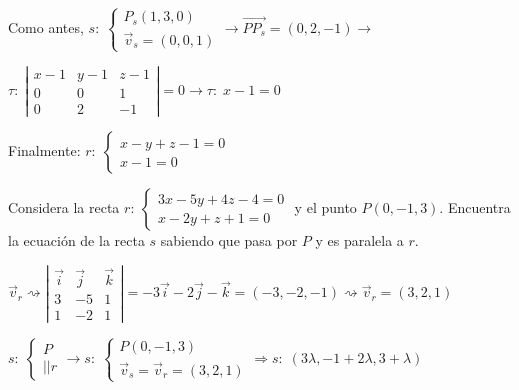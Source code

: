 \begin{proofw}
\noindent Como antes, $s:\; \begin{cases} P_s(1,3,0) \\ \vec v_s=(0,0,1) \end{cases} \to \overrightarrow{PP_s}=(0,2,-1) \to $

\noindent $\tau:\;\left| \begin{matrix} x-1&y-1&z-1\\0&0&1\\0&2&-1 \end{matrix} \right|=0 \to \tau:\; x-1=0 $

\noindent Finalmente: $r:\; \begin{cases} x-y+z-1=0\\x-1=0 \end{cases}$
	
\end{proofw}



\begin{ejre}
	Considera la recta $r:\: \begin{cases} 3x-5y+4z-4=0\\x-2y+z+1=0 \end{cases}$ y el punto $P(0,-1,3)$. Encuentra la ecuación de la recta $s$ sabiendo que pasa por $P$ y es paralela a $r$.
\end{ejre}

\begin{proofw}\renewcommand{\qedsymbol}{$\diamond$}
	$\vec v_r \rightsquigarrow  \left| \begin{matrix} \vec i&\vec j&\vec k \\3&-5&1\\1&-2&1 \end{matrix} \right|=-3\vec i -2 \vec j -\vec k=(-3,-2,-1) \rightsquigarrow \vec v_r=(3,2,1)$
	
\noindent $s:\;\begin{cases} P\\||r \end{cases} \to s:\;\begin{cases} P(0,-1,3)\\\vec v_s=\vec v_r=(3,2,1) \end{cases} \Rightarrow s:\; (3\lambda, -1+2\lambda, 3+\lambda)$
\end{proofw}



